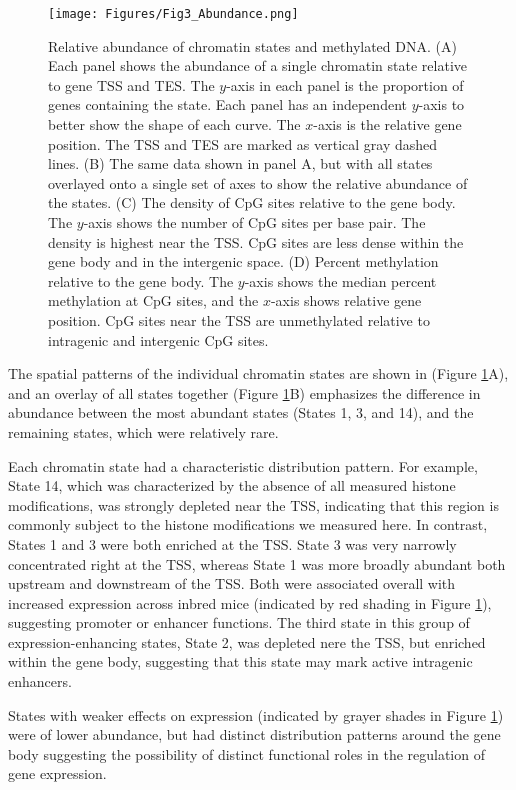 \documentclass[
  11pt,
]{article}
\begin{document}
\begin{figure}[ht!]
\texttt{[image: Figures/Fig3\_Abundance.png]} 
\caption{Relative abundance of chromatin states and methylated DNA. (A) Each panel 
shows the abundance of a single chromatin state relative to gene TSS and TES. The 
$y$-axis in each panel is the proportion of genes containing the state. Each
panel has an independent $y$-axis to better show the shape of each curve.
The $x$-axis is the relative gene position. The TSS and TES are marked as vertical
gray dashed lines. (B) The same data shown in panel A, but with all states overlayed
onto a single set of axes to show the relative abundance of the states. 
(C) The density of CpG sites relative to the gene body. The $y$-axis shows the 
number of CpG sites per base pair. The density is highest near the TSS. 
CpG sites are less dense within the gene body and in the intergenic space. 
(D) Percent methylation relative to the gene body. The $y$-axis shows the median 
percent methylation at CpG sites, and the $x$-axis shows relative gene position. 
CpG sites near the TSS are unmethylated relative to intragenic and intergenic
CpG sites.}
\label{fig:state_abundance}
\end{figure}

The spatial patterns of the individual chromatin states are shown in
(Figure \ref{fig:state_abundance}A), and an overlay of all states
together (Figure \ref{fig:state_abundance}B) emphasizes the difference
in abundance between the most abundant states (States 1, 3, and 14), and
the remaining states, which were relatively rare.

Each chromatin state had a characteristic distribution pattern. For
example, State 14, which was characterized by the absence of all
measured histone modifications, was strongly depleted near the TSS,
indicating that this region is commonly subject to the histone
modifications we measured here. In contrast, States 1 and 3 were both
enriched at the TSS. State 3 was very narrowly concentrated right at the
TSS, whereas State 1 was more broadly abundant both upstream and
downstream of the TSS. Both were associated overall with increased
expression across inbred mice (indicated by red shading in Figure
\ref{fig:state_abundance}), suggesting promoter or enhancer functions.
The third state in this group of expression-enhancing states, State 2,
was depleted nere the TSS, but enriched within the gene body, suggesting
that this state may mark active intragenic enhancers.

States with weaker effects on expression (indicated by grayer shades in
Figure \ref{fig:state_abundance}) were of lower abundance, but had
distinct distribution patterns around the gene body suggesting the
possibility of distinct functional roles in the regulation of gene
expression.
\end{document}
